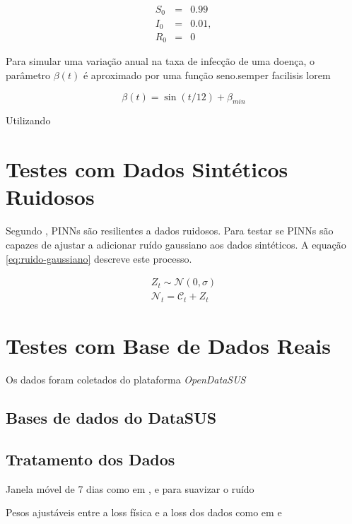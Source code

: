 \begin{eqnarray}
   S_0 &=& 0.99 \label{eq:S0}\\
   I_0 &=& 0.01, \label{eq:I0}\\
   R_0 &=& 0 \label{eq:R0}
\end{eqnarray}

Para simular uma variação anual na taxa de infecção de uma doença, o parâmetro
$\beta(t)$ é aproximado por uma função seno.semper facilisis lorem 

\begin{equation} \label{eq:beta_t_sintetetico}
    \beta(t) = \sin(t / 12)  + \beta_{min}
\end{equation}

Utilizando

\section{Testes com Dados Sintéticos Ruidosos}

Segundo \cite{raissi-etal:19}, PINNs são resilientes a dados ruidosos. Para
testar se PINNs são capazes de ajustar a 
adicionar ruído gaussiano aos dados sintéticos. A equação \ref{eq:ruido-gaussiano}
descreve este processo.

\begin{eqnarray}\label{eq:ruido-gaussiano}
    Z_t \sim \mathcal{N}(0, \sigma) \\
    \mathcal{N}_t = \mathcal{C}_t + Z_t  
\end{eqnarray}

\section{Testes com Base de Dados Reais}

Os dados foram coletados do plataforma \textit{OpenDataSUS} \cite{opendatasus}


\subsection{Bases de dados do DataSUS}

\subsection{Tratamento dos Dados}
Janela móvel de 7 dias como em \cite{han-etal:24-prim-artigo-alemanha},
\cite{long-etal:21-L2} e \cite{shamsara-etal:25-omicron} para suavizar o ruído

Pesos ajustáveis entre a loss física e a loss dos dados como em 
\cite{long-etal:21-L2} e 
\cite{shamsara-etal:25-omicron}

